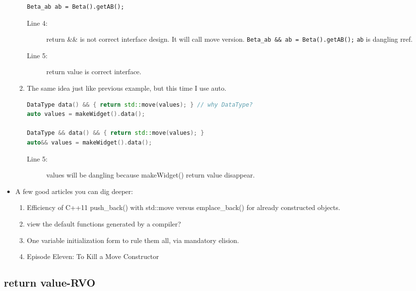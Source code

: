 \documentclass[a4paper,11pt,twoside]{book}
\begin{document}
\begin{itemize}
\begin{enumerate}
\begin{lstlisting}
Beta_ab ab = Beta().getAB();
\end{lstlisting}
\begin{description}
	\item[Line 4:] return \&\& is not correct interface design. It will call move version. \texttt{Beta\_ab \&\& ab = Beta().getAB();} \texttt{ab} is dangling rref.
	\item[Line 5:] return value is correct interface.
\end{description}

			\item The same idea just like previous example, but this time I use auto.
\begin{lstlisting}[frame=single, language=c++]
DataType data() && { return std::move(values); } // why DataType?
auto values = makeWidget().data();

DataType && data() && { return std::move(values); }
auto&& values = makeWidget().data();
\end{lstlisting}
\begin{description}
	\item[Line 5:] values will be dangling because makeWidget() return value disappear.
\end{description}

	\end{enumerate}

	\item A few good articles you can dig deeper:
	\begin{enumerate}
		\item Efficiency of C++11 push\_back() with std::move versus emplace\_back() for already constructed objects.
		\item view the default functions generated by a compiler?
		\item One variable initialization form to rule them all, via mandatory elision.
		\item Episode Eleven: To Kill a Move Constructor
	\end{enumerate}

\end{itemize}

\subsection{return value-RVO}
\end{document}
